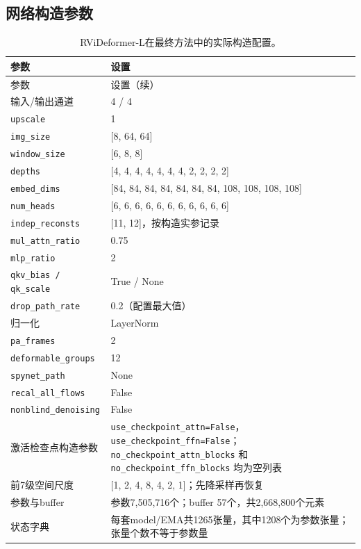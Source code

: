 \documentclass[11pt,a4paper,UTF8,fontset=fandol]{ctexart}
\begin{document}
\subsection{网络构造参数}

\begin{longtable}{P{0.31\textwidth}P{0.61\textwidth}}
\caption{RViDeformer-L在最终方法中的实际构造配置。}\label{tab:model_config}\\
\toprule 参数 & 设置 \\ \midrule
\endfirsthead
\toprule 参数 & 设置（续） \\ \midrule
\endhead
\bottomrule\endfoot
输入/输出通道 & 4 / 4 \\
\texttt{upscale} & 1 \\
\texttt{img\_size} & [8, 64, 64] \\
\texttt{window\_size} & [6, 8, 8] \\
\texttt{depths} & [4, 4, 4, 4, 4, 4, 4, 2, 2, 2, 2] \\
\texttt{embed\_dims} & [84, 84, 84, 84, 84, 84, 84, 108, 108, 108, 108] \\
\texttt{num\_heads} & [6, 6, 6, 6, 6, 6, 6, 6, 6, 6, 6] \\
\texttt{indep\_reconsts} & [11, 12]，按构造实参记录 \\
\texttt{mul\_attn\_ratio} & 0.75 \\
\texttt{mlp\_ratio} & 2 \\
\texttt{qkv\_bias / qk\_scale} & True / None \\
\texttt{drop\_path\_rate} & 0.2（配置最大值） \\
归一化 & LayerNorm \\
\texttt{pa\_frames} & 2 \\
\texttt{deformable\_groups} & 12 \\
\texttt{spynet\_path} & None \\
\texttt{recal\_all\_flows} & False \\
\texttt{nonblind\_denoising} & False \\
激活检查点构造参数 & \texttt{use\_checkpoint\_attn=False}，\texttt{use\_checkpoint\_ffn=False}；\texttt{no\_checkpoint\_attn\_blocks} 和 \texttt{no\_checkpoint\_ffn\_blocks} 均为空列表 \\
前7级空间尺度 & [1, 2, 4, 8, 4, 2, 1]；先降采样再恢复 \\
参数与buffer & 参数7,505,716个；buffer 57个，共2,668,800个元素 \\
状态字典 & 每套model/EMA共1265张量，其中1208个为参数张量；张量个数不等于参数量 \\
\end{longtable}
\end{document}
